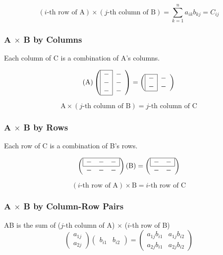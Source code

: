 \documentclass[12pt]{article}
\begin{document}
\[
(i\text{-th row of A}) \times (j\text{-th column of B}) = \sum_{k=1}^{n}{a_{ik}b_{kj}} = C_{ij}
\]

\subsubsection{A $\times$ B by Columns}
Each column of C is a combination of A's columns.

\[
(\text{A})
\left(
    \begin{array}{*{2}{c}}
    \cline{1-1}
    \multicolumn{1}{|c|}{-} & -\\
    \multicolumn{1}{|c|}{-} & -\\
    \multicolumn{1}{|c|}{-} & -\\
    \cline{1-1}
    \end{array}
\right)  
=
\left(
    \begin{array}{*{2}{c}}
    \cline{1-1}
    \multicolumn{1}{|c|}{-} & -\\
    \multicolumn{1}{|c|}{-} & -\\
    \cline{1-1}
    \end{array}
\right)  
\]

\[
\text{A} \times (j\text{-th column of B}) = j\text{-th column of C}
\]

\subsubsection{A $\times$ B by Rows}
Each row of C is a combination of B's rows.

\[
\left(
    \begin{array}{*{3}{c}}
    \cline{1-3}
    \multicolumn{1}{|c}{-} & - & \multicolumn{1}{c|}{-}\\
    \cline{1-3}
    - & - & -
    \end{array}
\right)
(\text{B})
=
\left(
    \begin{array}{*{2}{c}}
    \cline{1-2}
    \multicolumn{1}{|c}{-} & \multicolumn{1}{c|}{-}\\
    \cline{1-2}
    - & -
    \end{array}
\right)
\]

\[
(i\text{-th row of A}) \times \text{B} = i\text{-th row of C}
\]

\subsubsection{A $\times$ B by Column-Row Pairs}
AB is the sum of ($j$-th column of A) $\times$ ($i$-th row of B)
\[
\left(
    \begin{matrix}
        a_{1j}\\
        a_{2j}
    \end{matrix}
\right)
\left(
    \begin{matrix}
        b_{i1} & b_{i2}
    \end{matrix}
\right)
=
\left(
    \begin{matrix}
        a_{1j}b_{i1} & a_{1j}b_{i2}\\
        a_{2j}b_{i1} & a_{2j}b_{i2}
    \end{matrix}
\right)
\]
\end{document}
